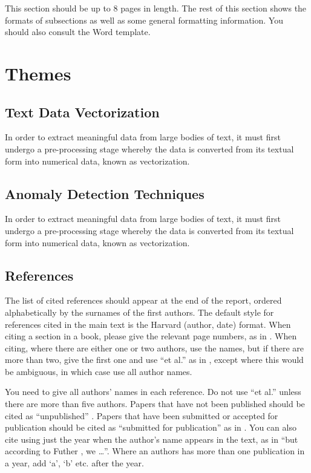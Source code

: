 \documentclass[12pt,a4paper]{article}
\begin{document}
This section should be up to 8 pages in length.
The rest of this section shows the formats of subsections as well as some general formatting information.  You should also consult the Word template.

\newpage

\section{Themes}

\subsection{Text Data Vectorization}
In order to extract meaningful data from large bodies of text, it must first undergo a pre-processing stage whereby the data is converted from its textual form into numerical data, known as vectorization. 

\subsection{Anomaly Detection Techniques}
In order to extract meaningful data from large bodies of text, it must first undergo a pre-processing stage whereby the data is converted from its textual form into numerical data, known as vectorization. 

\newpage

\subsection{References}

The list of cited references should appear at the end of the report, ordered alphabetically by the surnames of the first authors.  The default style for references cited in the main text is the  Harvard (author, date) format.  When citing a section in a book, please give the relevant page numbers, as in \cite[p293]{budgen}.  When citing, where there are either one or two authors, use the names, but if there are more than two, give the first one and use ``et al.'' as in  , except where this would be ambiguous, in which case use all author names.

You need to give all authors' names in each reference.  Do not use ``et al.'' unless there are more than five authors.  Papers that have not been published should be cited as ``unpublished'' \cite{euther}.  Papers that have been submitted or accepted for publication should be cited as ``submitted for publication'' as in \cite{futher} .  You can also cite using just the year when the author's name appears in the text, as in ``but according to Futher \citeyear{futher}, we \dots''.  Where an authors has more than one publication in a year, add `a', `b' etc. after the year.





\end{document}
